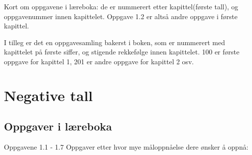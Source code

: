 \documentclass[a4, 11pt, twoside]{article}
\theoremstyle{definition}
\begin{document}
Kort om oppgavene i læreboka: de er nummerert etter kapittel(første tall), og
oppgavenummer innen kapittelet. Oppgave 1.2 er altså andre oppgave i første kapittel.

I tilleg er det en oppgavesamling bakerst i boken, som er nummerert med kapittelet på første siffer,
og stigende rekkefølge innen kapittelet. 100 er første oppgave for kapittel 1, 201 er andre oppgave for kapittel 2 osv.
\section{Negative tall}
\subsection{Oppgaver i læreboka}
Oppgavene 1.1 - 1.7
Oppgaver etter hvor mye måloppnåelse dere ønsker å oppnå:
\end{document}
